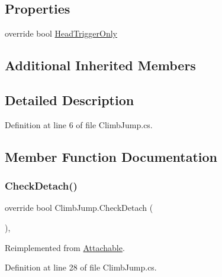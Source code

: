 \subsection*{Properties}
\begin{DoxyCompactItemize}
\item 
override bool \mbox{\hyperlink{class_climb_jump_a794d5397520c8d0420f6e1bd7a1c5ae8}{Head\+Trigger\+Only}}
\end{DoxyCompactItemize}
\subsection*{Additional Inherited Members}


\subsection{Detailed Description}


Definition at line 6 of file Climb\+Jump.\+cs.



\subsection{Member Function Documentation}
\mbox{\label{class_climb_jump_a16ddafaf15a3e7effb11ee3f433721f1}} 
\subsubsection{\texorpdfstring{Check\+Detach()}{CheckDetach()}}
{\footnotesize\ttfamily override bool Climb\+Jump.\+Check\+Detach (\begin{DoxyParamCaption}{ }\end{DoxyParamCaption})\hspace{0.3cm}{\ttfamily [protected]}, {\ttfamily [virtual]}}



Reimplemented from \mbox{\hyperlink{class_attachable_a5cd6ea1bf16c527c033e6f09681f84f8}{Attachable}}.



Definition at line 28 of file Climb\+Jump.\+cs.

\mbox{\label{class_climb_jump_a65ed10c05b80b5b2fe2df7112546f2fc}} 
